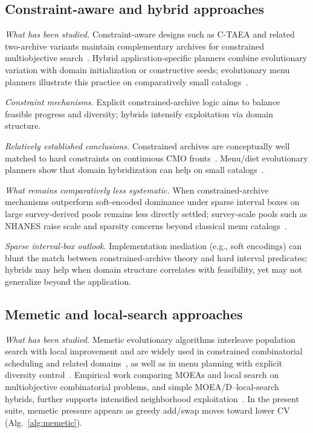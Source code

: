 \documentclass[lettersize,journal]{IEEEtran}
\begin{document}
\subsection{Constraint-aware and hybrid approaches}
\emph{What has been studied.}
Constraint-aware designs such as C-TAEA and related two-archive variants maintain complementary archives for constrained multiobjective search~\cite{li2019ctaea,li2022aconstrainedmultef18,zheng2021aconstrainedmult861c}.
Hybrid application-specific planners combine evolutionary variation with domain initialization or constructive seeds; evolutionary menu planners illustrate this practice on comparatively small catalogs~\cite{gaal2005,seljak2009,vassanyi2006,segura2019anovelmemeticalgb128,moreira2018anevolutionarymo6021,hernandezocana2018bacterialforagind382,zhao2025acmodiet}.

\emph{Constraint mechanisms.}
Explicit constrained-archive logic aims to balance feasible progress and diversity; hybrids intensify exploitation via domain structure.

\emph{Relatively established conclusions.}
Constrained archives are conceptually well matched to hard constraints on continuous CMO fronts~\cite{li2019ctaea,li2022aconstrainedmultef18}.
Menu/diet evolutionary planners show that domain hybridization can help on small catalogs~\cite{gaal2005,seljak2009,vassanyi2006,segura2019anovelmemeticalgb128}.

\emph{What remains comparatively less systematic.}
When constrained-archive mechanisms outperform soft-encoded dominance under sparse interval boxes on large survey-derived pools remains less directly settled; survey-scale pools such as NHANES raise scale and sparsity concerns beyond classical menu catalogs~\cite{zhao2026dmp4p}.

\emph{Sparse interval-box outlook.}
Implementation mediation (e.g., soft encodings) can blunt the match between constrained-archive theory and hard interval predicates; hybrids may help when domain structure correlates with feasibility, yet may not generalize beyond the application.

\subsection{Memetic and local-search approaches}
\emph{What has been studied.}
Memetic evolutionary algorithms interleave population search with local improvement and are widely used in constrained combinatorial scheduling and related domains~\cite{rahman2019aneffectivememet26b9,colominedurn2026multiobjectivemefc01}, as well as in menu planning with explicit diversity control~\cite{segura2019anovelmemeticalgb128}.
Empirical work comparing MOEAs and local search on multiobjective combinatorial problems, and simple MOEA/D--local-search hybrids, further supports intensified neighborhood exploitation~\cite{li2024empiricalcompari3898,derbel2025asimplecombinatia389}.
In the present suite, memetic pressure appears as greedy add/swap moves toward lower $\mathrm{CV}$ (Alg.~\ref{alg:memetic}).
\end{document}
